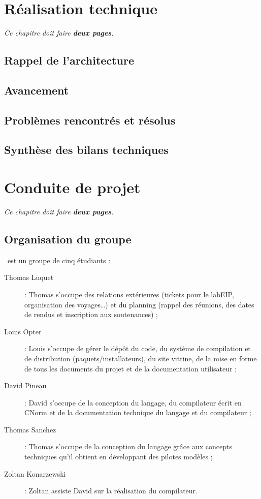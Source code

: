 \documentclass[francais]{rtxreport}
\begin{document}

\chapter{Réalisation technique}

\emph{Ce chapitre doit faire \textbf{deux pages}.}

\section{Rappel de l'architecture}

\section{Avancement}

\section{Problèmes rencontrés et résolus}

\section{Synthèse des bilans techniques}

\chapter{Conduite de projet}

\emph{Ce chapitre doit faire \textbf{deux pages}.}

\section{Organisation du groupe}

\rtx\ est un groupe de cinq étudiants :
\begin{description}
\item[Thomas Luquet] : Thomas s'occupe des relations extérieures (tickets pour
le labEIP, organisation des voyages\ldots) et du planning (rappel des réunions,
des dates de rendus et inscription aux soutenances) ;
\item[Louis Opter] : Louis s'occupe de gérer le dépôt du code, du système de
compilation et de distribution (paquets/installateurs), du site vitrine, de la
mise en forme de tous les documents du projet et de la documentation
utilisateur ;
\item[David Pineau] : David s'occupe de la conception du langage, du
compilateur écrit en CNorm et de la documentation technique du langage et du
compilateur ;
\item[Thomas Sanchez] : Thomas s'occupe de la conception du langage grâce aux
concepts techniques qu'il obtient en développant des pilotes modèles ;
\item[Zoltan Konarzewski] : Zoltan assiste David sur la réalisation du
compilateur.
\end{description}
\end{document}
